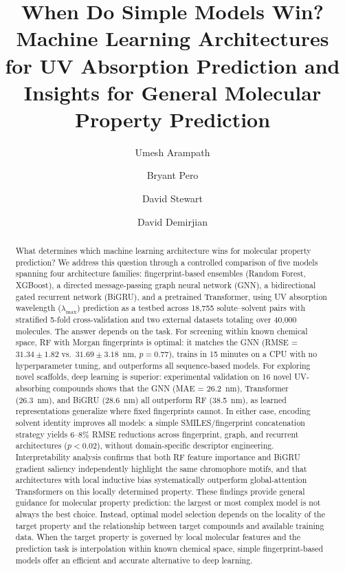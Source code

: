 \documentclass[journal=jcisd8,manuscript=article]{achemso}
\title{When Do Simple Models Win? Machine Learning Architectures for UV Absorption Prediction and Insights for General Molecular Property Prediction}
\author{Umesh Arampath}
\affiliation{Department of Mathematics, University of Iowa, Iowa City, USA}
\author{Bryant Pero}
\affiliation{Midwest Bioprocessing Center, Illinois, USA}
\author{David Stewart}
\affiliation{Department of Mathematics, University of Iowa, Iowa City, USA}
\author{David Demirjian}
\affiliation{Midwest Bioprocessing Center, Illinois, USA}
\begin{document}
\maketitle

\begin{abstract}
What determines which machine learning architecture wins for molecular property prediction?
We address this question through a controlled comparison of five models spanning four architecture families: fingerprint-based ensembles (Random Forest, XGBoost), a directed message-passing graph neural network (GNN), a bidirectional gated recurrent network (BiGRU), and a pretrained Transformer, using UV absorption wavelength ($\lambda_{\max}$) prediction as a testbed across 18,755 solute--solvent pairs with stratified 5-fold cross-validation and two external datasets totaling over 40,000 molecules.
The answer depends on the task.
For screening within known chemical space, RF with Morgan fingerprints is optimal: it matches the GNN (RMSE = $31.34 \pm 1.82$ vs.\ $31.69 \pm 3.18$~nm, $p = 0.77$), trains in 15 minutes on a CPU with no hyperparameter tuning, and outperforms all sequence-based models.
For exploring novel scaffolds, deep learning is superior: experimental validation on 16 novel UV-absorbing compounds shows that the GNN (MAE = 26.2~nm), Transformer (26.3~nm), and BiGRU (28.6~nm) all outperform RF (38.5~nm), as learned representations generalize where fixed fingerprints cannot.
In either case, encoding solvent identity improves all models: a simple SMILES/fingerprint concatenation strategy yields 6--8\% RMSE reductions across fingerprint, graph, and recurrent architectures ($p < 0.02$), without domain-specific descriptor engineering.
Interpretability analysis confirms that both RF feature importance and BiGRU gradient saliency independently highlight the same chromophore motifs, and that architectures with local inductive bias systematically outperform global-attention Transformers on this locally determined property.
These findings provide general guidance for molecular property prediction: the largest or most complex model is not always the best choice. Instead, optimal model selection depends on the locality of the target property and the relationship between target compounds and available training data. When the target property is governed by local molecular features and the prediction task is interpolation within known chemical space, simple fingerprint-based models offer an efficient and accurate alternative to deep learning.
\end{abstract}
\end{document}
